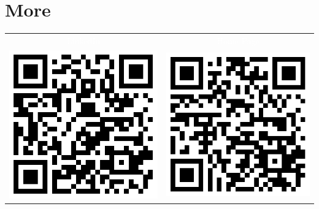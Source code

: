 \documentclass[a4paper]{article}
\begin{document}
\section*{More}

\begin{tabular}{c|c}  
	\cellcolor{black}\textcolor{white}{LinkedIn} & \cellcolor{black}\textcolor{white}{Home Page} \\
	\includegraphics[scale=0.4]{qrcode_lnkdn.png} &  \includegraphics[scale=0.4]{qrcode_hme.png} 
\end{tabular}
\end{document}
